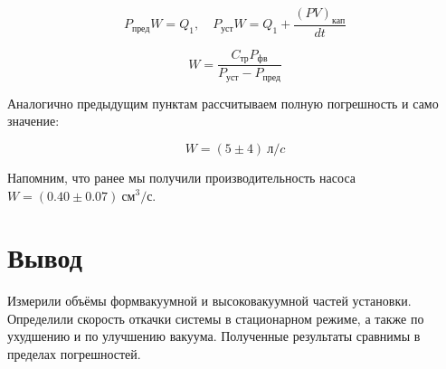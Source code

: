 \documentclass[a4paper, 12pt]{article}
\begin{document}
		    $$P_{пред}W = Q_1, \quad P_{уст}W = Q_1 + \frac{(PV)_{кап}}{dt}$$

            $$W = \frac{C_{тр} P_{фв}}{P_{уст} - P_{пред}}$$

            Аналогично предыдущим пунктам рассчитываем полную погрешность и само значение:

            $$W = (5 \pm 4)~л/c$$

            Напомним, что ранее мы получили производительность насоса $W = (0.40 \pm 0.07)~см^3/с$.

    \section{Вывод}

        Измерили объёмы формвакуумной и высоковакуумной частей установки. Определили скорость откачки системы в стационарном режиме, а также по ухудшению и по улучшению вакуума. Полученные результаты сравнимы в пределах погрешностей.
\end{document}
